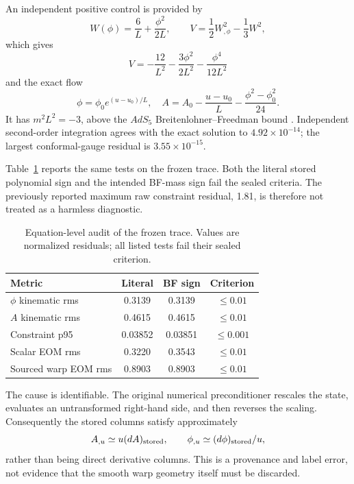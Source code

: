\documentclass[10pt]{article}
\begin{document}
An independent positive control is provided by
\begin{equation}
 W(\phi)=\frac6L+\frac{\phi^2}{2L},\qquad
 V=\frac12W_{,\phi}^2-\frac13W^2,
\end{equation}
which gives
\begin{equation}
 V=-\frac{12}{L^2}-\frac{3\phi^2}{2L^2}-\frac{\phi^4}{12L^2}
\end{equation}
and the exact flow
\begin{equation}
 \phi=\phi_0e^{(u-u_0)/L},\quad
 A=A_0-\frac{u-u_0}{L}-\frac{\phi^2-\phi_0^2}{24}.
\end{equation}
It has $m^2L^2=-3$, above the $AdS_5$ Breitenlohner--Freedman bound
\citep{Breitenlohner1982}.  Independent second-order integration agrees with
the exact solution to $4.92\times10^{-14}$; the largest conformal-gauge
residual is $3.55\times10^{-15}$.

Table~\ref{tab:audit} reports the same tests on the frozen trace.  Both the
literal stored polynomial sign and the intended BF-mass sign fail the sealed
criteria.  The previously reported maximum raw constraint residual, 1.81, is
therefore not treated as a harmless diagnostic.

\begin{table}
 \centering
 \caption{Equation-level audit of the frozen trace.  Values are normalized
 residuals; all listed tests fail their sealed criterion.}
 \label{tab:audit}
 \begin{tabular}{lccc}
  \toprule
  Metric & Literal & BF sign & Criterion\\
  \midrule
  $\phi$ kinematic rms & 0.3139 & 0.3139 & $\leq0.01$\\
  $A$ kinematic rms & 0.4615 & 0.4615 & $\leq0.01$\\
  Constraint p95 & 0.03852 & 0.03851 & $\leq0.001$\\
  Scalar EOM rms & 0.3220 & 0.3543 & $\leq0.01$\\
  Sourced warp EOM rms & 0.8903 & 0.8903 & $\leq0.01$\\
  \bottomrule
 \end{tabular}
\end{table}

The cause is identifiable.  The original numerical preconditioner rescales
the state, evaluates an untransformed right-hand side, and then reverses the
scaling.  Consequently the stored columns satisfy approximately
\begin{equation}
 A_{,u}\simeq u(dA)_{\rm stored},\qquad
 \phi_{,u}\simeq (d\phi)_{\rm stored}/u,
 \label{eq:storedrelation}
\end{equation}
rather than being direct derivative columns.  This is a provenance and label
error, not evidence that the smooth warp geometry itself must be discarded.
\end{document}
